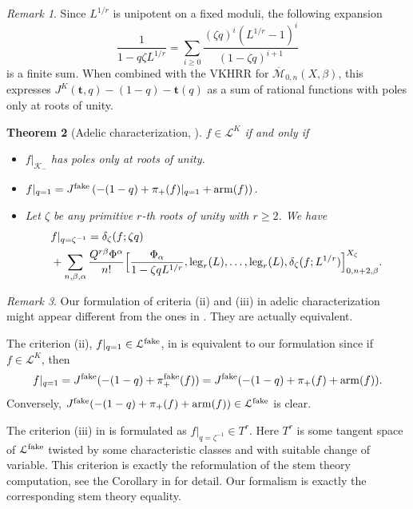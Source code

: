 \documentclass[11pt]{amsart}
\newtheorem{theorem}{Theorem}[section]
\newtheorem*{main theorem*}{Main Theorem}
\theoremstyle{remark}
\newtheorem{remark}[theorem]{Remark}
\numberwithin{equation}{section}
\newcommand{\M}{\overline{\mathcal{M}}}
\newcommand{\K}{\mathcal{K}}
\newcommand{\fake}{{\rm fake}}
\newcommand{\KK}{{K}}
\newcommand{\leg}{{\rm leg}}
\newcommand{\arm}{{\rm arm}}
\begin{document}
\begin{remark} \label{r:2.5}
Since $L^{1/r}$ is unipotent on a fixed moduli, the following expansion
\[
\frac{1}{1-q\zeta L^{1/r}} = \sum_{i \geq 0} \frac{ (\zeta q)^i (L^{1/r} -1)^i }{ (1-\zeta q)^{i+1} }
\]
is a finite sum. When combined with the VKHRR for $\M_{0,n}(X,\beta)$, this expresses $J^{\KK}(\mathbf{t},q) -(1-q) - \mathbf{t}(q)$ as a sum of rational functions with poles only at roots of unity.
\end{remark}





\begin{theorem}[Adelic characterization, {\cite[\S~6]{Givental_Tonita_2011} }] \label{thm_adelic_charac}
$f\in \mathcal{L}^K$ if and only if
\begin{itemize}
    \item[(i)]$f|_{\mathcal{K}_-}$ has poles only at roots of unity.
    \item[(ii)] $f|_{q=1} = J^{\fake} \left( -(1-q) + \pi_+(f)|_{q=1} + \arm(f) \right)$.
    \item[(iii)] Let $\zeta$ be any primitive $r$-th roots of unity with $r\geq 2$. We have
    \[
    \begin{split}
        & f|_{q=\zeta^{-1}} = \delta_{\zeta}(f; \zeta q)
        \\
        &+ \sum_{n,\beta,\alpha} \frac{Q^{r\beta} \Phi^{\alpha}}{n!} \Big[ \frac{\Phi_{\alpha}}{1-\zeta q L^{1/r}}, \leg_{r}(L) ,\dots, \leg_{r}(L), \delta_{\zeta}(f;L^{1/r}) \Big]^{{X}_{\zeta}}_{0,n+2,\beta}.
    \end{split}
    \]
\end{itemize}
\end{theorem}
\begin{remark}
    Our formulation of criteria (ii) and (iii) in adelic characterization might appear different from the ones in \cite[\S~6]{Givental_Tonita_2011}. They are actually equivalent.

    The criterion (ii), $f|_{q=1} \in \mathcal{L}^{\fake}$, in \cite[\S~6]{Givental_Tonita_2011} is equivalent to our formulation since if $f\in \mathcal{
    L}^K$, then 
    \[
    f|_{q=1} = J^{\fake}( -(1-q) + \pi_+^{\fake}(f) ) = J^{\fake}( -(1-q) + \pi_+(f) + \arm(f) ).
    \]
    Conversely, $J^{\fake}(-(1-q) + \pi_+(f) + \arm(f)) \in \mathcal{L}^{\fake}$ is clear.
    
    The criterion (iii) in \cite[\S~6]{Givental_Tonita_2011} is formulated as $f|_{q=\zeta^{-1}} \in T^r$. Here $T^r$ is some tangent space of $\mathcal{L}^{\fake}$ twisted by some characteristic classes and with suitable change of variable. This criterion is exactly the reformulation of the stem theory computation, see the Corollary in \cite[\S~8]{Givental_Tonita_2011} for detail. Our formalism is exactly the corresponding stem theory equality.
\end{remark}
\end{document}
